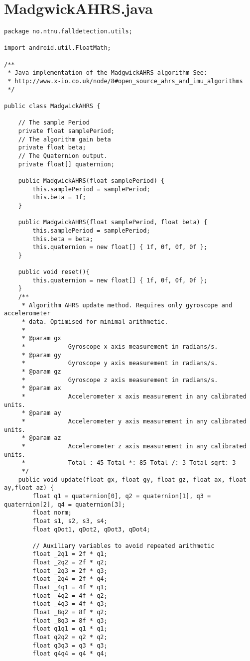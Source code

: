 \chapter{MadgwickAHRS.java}
\label{app:madgwickImplementation}
\begin{lstlisting}
package no.ntnu.falldetection.utils;

import android.util.FloatMath;

/**
 * Java implementation of the MadgwickAHRS algorithm See:
 * http://www.x-io.co.uk/node/8#open_source_ahrs_and_imu_algorithms
 */

public class MadgwickAHRS {

	// The sample Period
	private float samplePeriod;
	// The algorithm gain beta
	private float beta;
	// The Quaternion output.
	private float[] quaternion;

	public MadgwickAHRS(float samplePeriod) {
		this.samplePeriod = samplePeriod;
		this.beta = 1f;
	}

	public MadgwickAHRS(float samplePeriod, float beta) {
		this.samplePeriod = samplePeriod;
		this.beta = beta;
		this.quaternion = new float[] { 1f, 0f, 0f, 0f };
	}

	public void reset(){
		this.quaternion = new float[] { 1f, 0f, 0f, 0f };
	}
	/**
	 * Algorithm AHRS update method. Requires only gyroscope and accelerometer
	 * data. Optimised for minimal arithmetic.
	 * 
	 * @param gx
	 *            Gyroscope x axis measurement in radians/s.
	 * @param gy
	 *            Gyroscope y axis measurement in radians/s.
	 * @param gz
	 *            Gyroscope z axis measurement in radians/s.
	 * @param ax
	 *            Accelerometer x axis measurement in any calibrated units.
	 * @param ay
	 *            Accelerometer y axis measurement in any calibrated units.
	 * @param az
	 *            Accelerometer z axis measurement in any calibrated units.
	 *            Total : 45 Total *: 85 Total /: 3 Total sqrt: 3
	 */
	public void update(float gx, float gy, float gz, float ax, float ay,float az) {
		float q1 = quaternion[0], q2 = quaternion[1], q3 = quaternion[2], q4 = quaternion[3]; 
		float norm;
		float s1, s2, s3, s4;
		float qDot1, qDot2, qDot3, qDot4;

		// Auxiliary variables to avoid repeated arithmetic
		float _2q1 = 2f * q1;
		float _2q2 = 2f * q2;
		float _2q3 = 2f * q3;
		float _2q4 = 2f * q4;
		float _4q1 = 4f * q1;
		float _4q2 = 4f * q2;
		float _4q3 = 4f * q3;
		float _8q2 = 8f * q2;
		float _8q3 = 8f * q3;
		float q1q1 = q1 * q1;
		float q2q2 = q2 * q2;
		float q3q3 = q3 * q3;
		float q4q4 = q4 * q4;


\end{lstlisting}
